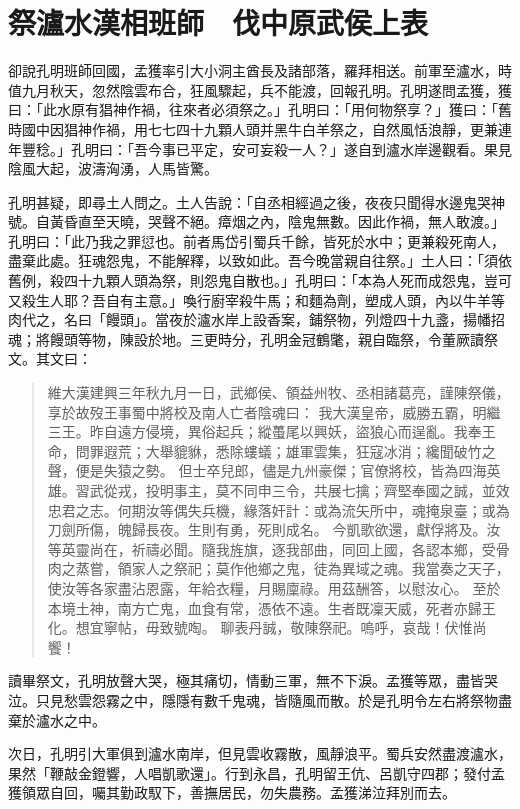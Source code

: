 
\chapter{祭瀘水漢相班師　伐中原武侯上表}

卻說孔明班師回國，孟獲率引大小洞主酋長及諸部落，羅拜相送。前軍至瀘水，時值九月秋天，忽然陰雲布合，狂風驟起，兵不能渡，回報孔明。孔明遂問孟獲，獲曰：「此水原有猖神作禍，往來者必須祭之。」孔明曰：「用何物祭享？」獲曰：「舊時國中因猖神作禍，用七七四十九顆人頭并黑牛白羊祭之，自然風恬浪靜，更兼連年豐稔。」孔明曰：「吾今事已平定，安可妄殺一人？」遂自到瀘水岸邊觀看。果見陰風大起，波濤洶湧，人馬皆驚。

孔明甚疑，即尋土人問之。土人告說：「自丞相經過之後，夜夜只聞得水邊鬼哭神號。自黃昏直至天曉，哭聲不絕。瘴烟之內，陰鬼無數。因此作禍，無人敢渡。」孔明曰：「此乃我之罪愆也。前者馬岱引蜀兵千餘，皆死於水中；更兼殺死南人，盡棄此處。狂魂怨鬼，不能解釋，以致如此。吾今晚當親自往祭。」土人曰：「須依舊例，殺四十九顆人頭為祭，則怨鬼自散也。」孔明曰：「本為人死而成怨鬼，豈可又殺生人耶？吾自有主意。」喚行廚宰殺牛馬；和麵為劑，塑成人頭，內以牛羊等肉代之，名曰「饅頭」。當夜於瀘水岸上設香案，鋪祭物，列燈四十九盞，揚幡招魂；將饅頭等物，陳設於地。三更時分，孔明金冠鶴氅，親自臨祭，令董厥讀祭文。其文曰：

\begin{quote}
維大漢建興三年秋九月一日，武鄉侯、領益州牧、丞相諸葛亮，謹陳祭儀，享於故歿王事蜀中將校及南人亡者陰魂曰：
我大漢皇帝，威勝五霸，明繼三王。昨自遠方侵境，異俗起兵；縱蠆尾以興妖，盜狼心而逞亂。我奉王命，問罪遐荒；大舉貔貅，悉除螻蟻；雄軍雲集，狂寇冰消；纔聞破竹之聲，便是失猿之勢。
但士卒兒郎，儘是九州豪傑；官僚將校，皆為四海英雄。習武從戎，投明事主，莫不同申三令，共展七擒；齊堅奉國之誠，並效忠君之志。何期汝等偶失兵機，緣落奸計：或為流矢所中，魂掩泉臺；或為刀劍所傷，魄歸長夜。生則有勇，死則成名。
今凱歌欲還，獻俘將及。汝等英靈尚在，祈禱必聞。隨我旌旗，逐我部曲，同回上國，各認本鄉，受骨肉之蒸嘗，領家人之祭祀；莫作他鄉之鬼，徒為異域之魂。我當奏之天子，使汝等各家盡沾恩露，年給衣糧，月賜廩祿。用茲酬答，以慰汝心。
至於本境土神，南方亡鬼，血食有常，憑依不遠。生者既凜天威，死者亦歸王化。想宜寧帖，毋致號啕。
聊表丹誠，敬陳祭祀。嗚呼，哀哉！伏惟尚饗！
\end{quote}

讀畢祭文，孔明放聲大哭，極其痛切，情動三軍，無不下淚。孟獲等眾，盡皆哭泣。只見愁雲怨霧之中，隱隱有數千鬼魂，皆隨風而散。於是孔明令左右將祭物盡棄於瀘水之中。

次日，孔明引大軍俱到瀘水南岸，但見雲收霧散，風靜浪平。蜀兵安然盡渡瀘水，果然「鞭敲金鐙響，人唱凱歌還」。行到永昌，孔明留王伉、呂凱守四郡；發付孟獲領眾自回，囑其勤政馭下，善撫居民，勿失農務。孟獲涕泣拜別而去。


